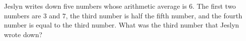 Jeslyn writes down five numbers whose arithmetic average is $6$. The first two numbers are $3$ and $7$, the third number is half the fifth number, and the fourth number is equal to the third number. What was the third number that Jeslyn wrote down?

